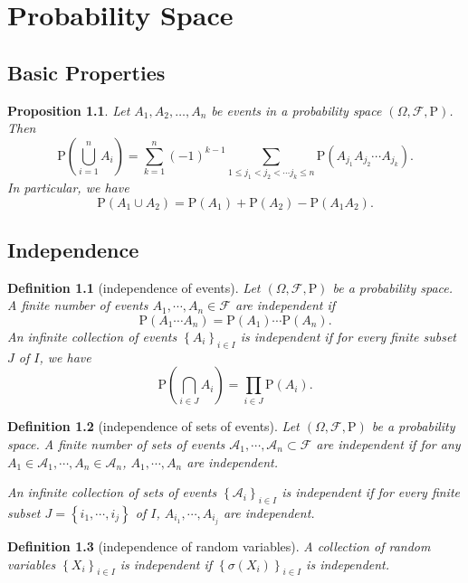 \documentclass{report}
\newtheorem{definition}{Definition}[section]
\newtheorem{proposition}{Proposition}[section]
\theoremstyle{nonumberplain}
\begin{document}
\chapter{Probability Space}
\section{Basic Properties}
\begin{proposition}
	Let $A_{1}, A_{2}, \ldots, A_{n}$ be events in a probability space $(\Omega, \mathcal{F}, \mathrm{P})$. Then
	$$
	\mathrm{P}\left(\bigcup_{i=1}^{n} A_{i}\right)=\sum_{k=1}^{n}(-1)^{k-1}\sum_{1 \leq j_{1}<j_{2}<\cdots j_{k} \leq n} \mathrm{P}\left(A_{j_{1}} A_{j_{2}} \cdots A_{j_{k}}\right).
	$$
	In particular, we have
	\[
		\mathrm{P}\left(A_1\cup A_2\right)=\mathrm{P}(A_1)+\mathrm{P}(A_2)-\mathrm{P}(A_1A_2).
	\]
\end{proposition}

\section{Independence}
\begin{definition}[independence of events]
	Let $(\Omega, \mathcal{F}, \mathrm{P})$ be a probability space. A finite number of events $A_{1}, \cdots, A_{n} \in \mathcal{F}$ are \emph{independent} if
	$$
	\mathrm{P}\left(A_{1}\cdots A_{n}\right)=\mathrm{P}\left(A_{1}\right) \cdots \mathrm{P}\left(A_{n}\right) .
	$$
	An infinite collection of events $\left\{A_{i}\right\}_{i\in I}$ is independent if for every finite subset $J$ of $I$, we have
	$$
	\mathrm{P}\left(\bigcap_{i\in J}A_i\right)=\prod_{i\in J}\mathrm{P}\left(A_{i}\right).
	$$	
\end{definition}

\begin{definition}[independence of sets of events] 
	Let $(\Omega, \mathcal{F}, \mathrm{P})$ be a probability space. A finite number of sets of events $\mathcal{A}_{1}, \cdots, \mathcal{A}_{n} \subset \mathcal{F}$ are independent if for any $A_1\in \mathcal{A}_{1},\cdots,A_{n}\in \mathcal{A}_{n}$, $A_1,\cdots,A_n$ are independent.

	An infinite collection of sets of events $\left\{\mathcal{A}_{i}\right\}_{i\in I}$ is independent if for every finite subset $J=\left\{i_1,\cdots,i_j\right\}$ of $I$, $A_{i_1},\cdots,A_{i_j}$ are independent.
\end{definition}

\begin{definition}[independence of random variables] 
	A collection of random variables $\left\{X_{i}\right\}_{i\in I}$ is independent if $\left\{\sigma\left(X_{i}\right)\right\}_{i\in I}$ is independent.
\end{definition}
\end{document}
